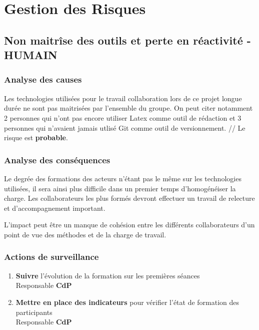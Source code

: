 \section{Gestion des Risques}

\subsection{Non maitrîse des outils et perte en réactivité - HUMAIN}
\subsubsection{Analyse des causes}

Les technologies utilisées pour le travail collaboration lors de ce projet longue durée ne sont pas maitrisées par l'ensemble du groupe.
On peut citer notamment 2 personnes qui n'ont pas encore utiliser Latex comme outil de rédaction et 3 personnes qui n'avaient jamais utlisé Git comme outil de versionnement. //
Le risque est {\bf probable}.

\subsubsection{Analyse des conséquences}

Le degrée des formations des acteurs n'étant pas le même sur les technologies utilisées, il sera ainsi plus difficile dans un premier temps d'homogénéiser la charge. Les collaborateurs les plus formés devront effectuer un travail de relecture et d'accompagnement important. 

L'impact peut être un manque de cohésion entre les différents collaborateurs d'un point de vue des méthodes et de la charge de travail.

\subsubsection{Actions de surveillance}

\begin{enumerate}
\item {\bf Suivre} l'évolution de la formation sur les premières séances \\ Responsable {\bf CdP}
\item {\bf Mettre en place des indicateurs} pour vérifier l'état de formation des participants \\ Responsable {\bf CdP}
\end{enumerate}

